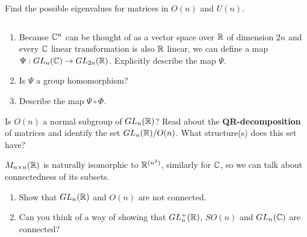 \begin{exercise}
	Find the possible eigenvalues for matrices in $O(n)$ and $U(n)$.
\end{exercise}

\begin{exercise}$\:$
	\begin{enumerate}
		\item Because $\mathbb{C}^n$ can be thought of as a vector space over $\mathbb{R}$ of dimension $2n$ and every $\mathbb{C}$ linear transformation is also $\mathbb{R}$ linear, we can define a map $\Psi:GL_{n}(\mathbb{C}) \rightarrow GL_{2n}(\mathbb{R})$. Explicitly describe the map $\Psi$.
		\item Is $\Psi$ a group homomorphism?
		\item Describe the map $\Psi \circ \Phi$.
	\end{enumerate}

\end{exercise}

\begin{exercise}
	Is $O(n)$ a normal subgroup of $GL_n(\mathbb{R})$? Read about the \textbf{QR-decomposition} of matrices and identify the set $GL_n(\mathbb{R})/O(n)$. What structure(s) does this set have?
\end{exercise}

\begin{exercise}
	$M_{n \times n}(\mathbb{R})$ is naturally isomorphic to $\mathbb{R}^{(n^2)}$, similarly for $\mathbb{C}$, so we can talk about connectedness of its subsets.
	\begin{enumerate}
		\item Show that $GL_n(\mathbb{R})$ and $O(n)$ are not connected.
		\item Can you think of a way of showing that $GL_n^+(\mathbb{R})$, $SO(n)$ and $GL_n(\mathbb{C})$ are connected?
	\end{enumerate}
\end{exercise}






\iffalse
$SO(n)$ is precisely the kernel of the determinant map $\det : O(n) \rightarrow \{ -1, +1\}$ and so we have an isomorphism
\begin{align}
	O(n) / SO(n) \cong \Z/2
\end{align}

\raisebox{10pt}{\dbend} We think of elements of $SO(n)$ as rotations of $\R^n$ and the elements of the coset $O(n) \setminus SO(n)$ as reflections of $\R^n$. When $n>3$ these words do not agree with our standard notion of rotation as there are multiple axes around which rotations can occur independently.
\fi



\iffalse
As $\det A^T = \det A$ for orthogonal matrices $A \in O(n)$ we get
\begin{align}
	(\det A )^2 = \det(A^2) & = \det(A^T A) = \det (I_n) = 1 \\
	\implies \qquad \det A  & = \pm 1
\end{align}
This is a very useful property and we will exploit this to understand elements of $O(n)$ later.
\fi
